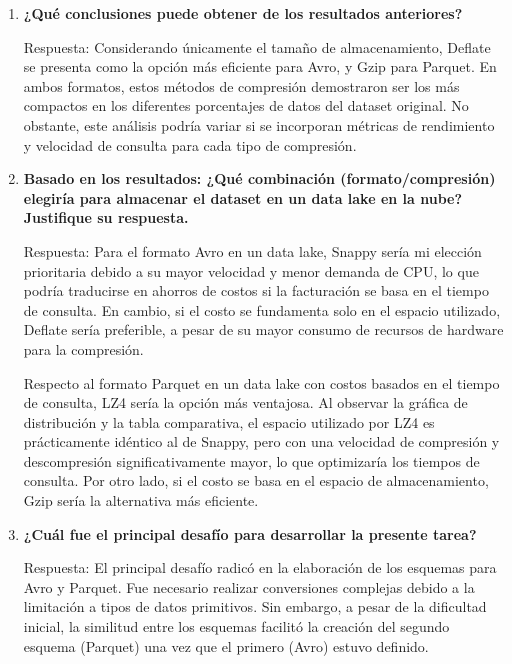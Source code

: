 \documentclass{article}
\begin{document}
	\begin{enumerate}
		\item \textbf{¿Qué conclusiones puede obtener de los resultados anteriores?}
		
		Respuesta: Considerando únicamente el tamaño de almacenamiento, Deflate se presenta como la opción más eficiente para Avro, y Gzip para Parquet. En ambos formatos, estos métodos de compresión demostraron ser los más compactos en los diferentes porcentajes de datos del dataset original. No obstante, este análisis podría variar si se incorporan métricas de rendimiento y velocidad de consulta para cada tipo de compresión.
		
		\item \textbf{Basado en los resultados: ¿Qué combinación (formato/compresión) elegiría para almacenar el dataset en un data lake en la nube? Justifique su respuesta.}
		
		Respuesta: Para el formato Avro en un data lake, Snappy sería mi elección prioritaria debido a su mayor velocidad y menor demanda de CPU, lo que podría traducirse en ahorros de costos si la facturación se basa en el tiempo de consulta. En cambio, si el costo se fundamenta solo en el espacio utilizado, Deflate sería preferible, a pesar de su mayor consumo de recursos de hardware para la compresión.
		
		Respecto al formato Parquet en un data lake con costos basados en el tiempo de consulta, LZ4 sería la opción más ventajosa. Al observar la gráfica de distribución y la tabla comparativa, el espacio utilizado por LZ4 es prácticamente idéntico al de Snappy, pero con una velocidad de compresión y descompresión significativamente mayor, lo que optimizaría los tiempos de consulta. Por otro lado, si el costo se basa en el espacio de almacenamiento, Gzip sería la alternativa más eficiente.
		
		\item \textbf{¿Cuál fue el principal desafío para desarrollar la presente tarea?}
		
		Respuesta: El principal desafío radicó en la elaboración de los esquemas para Avro y Parquet. Fue necesario realizar conversiones complejas debido a la limitación a tipos de datos primitivos. Sin embargo, a pesar de la dificultad inicial, la similitud entre los esquemas facilitó la creación del segundo esquema (Parquet) una vez que el primero (Avro) estuvo definido.
		
	\end{enumerate}
	
\end{document}
